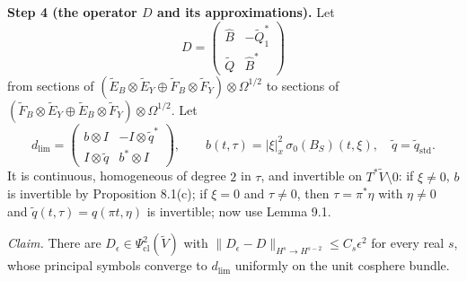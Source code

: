 \documentclass[
  11pt,
]{article}
\begin{document}
\textbf{Step 4 (the operator \(D\) and its approximations).} Let \[
D=\begin{pmatrix}\hat B&-\tilde Q_1^*\\ \tilde Q&\hat B^*\end{pmatrix}
\tag{10.4}
\] from sections of
\((\tilde E_B\otimes\tilde E_Y\oplus\tilde F_B\otimes\tilde F_Y)\otimes\Omega^{1/2}\)
to sections of
\((\tilde F_B\otimes\tilde E_Y\oplus\tilde E_B\otimes\tilde F_Y)\otimes\Omega^{1/2}\).
Let \[
d_{\lim}=\begin{pmatrix}b\otimes I&-I\otimes\tilde q^*\\ I\otimes\tilde q&b^*\otimes I\end{pmatrix},\qquad b(t,\tau)=|\xi|_x^2\,\sigma_0(B_S)(t,\xi),\quad\tilde q=\tilde q_{\mathrm{std}} .
\tag{10.5}
\] It is continuous, homogeneous of degree \(2\) in \(\tau\), and
invertible on \(T^*\tilde V\setminus0\): if \(\xi\ne0\), \(b\) is
invertible by Proposition 8.1(c); if \(\xi=0\) and \(\tau\ne0\), then
\(\tau=\pi^*\eta\) with \(\eta\ne0\) and
\(\tilde q(t,\tau)=q(\pi t,\eta)\) is invertible; now use Lemma 9.1.

\emph{Claim.} There are \(D_\epsilon\in\Psi^2_{\mathrm{cl}}(\tilde V)\)
with \(\|D_\epsilon-D\|_{H^s\to H^{s-2}}\le C_s\epsilon^2\) for every
real \(s\), whose principal symbols converge to \(d_{\lim}\) uniformly
on the unit cosphere bundle.
\end{document}
